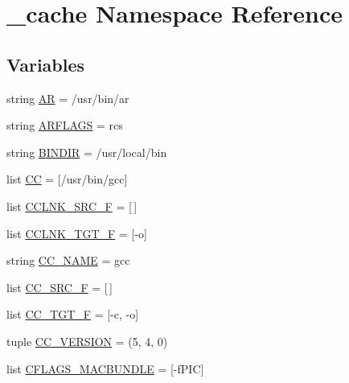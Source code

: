 \hypertarget{namespace__cache}{}\section{\+\_\+cache Namespace Reference}
\label{namespace__cache}
\subsection*{Variables}
\begin{DoxyCompactItemize}
\item 
string \hyperlink{namespace__cache_a9d44e2832ad98b40a7f591b4471b7814}{AR} = \textquotesingle{}/usr/bin/ar\textquotesingle{}
\item 
string \hyperlink{namespace__cache_a395ef3eaeed77b4070ca7457afbf4635}{A\+R\+F\+L\+A\+GS} = \textquotesingle{}rcs\textquotesingle{}
\item 
string \hyperlink{namespace__cache_a39d7403c7b95311b5d340d6b9c18cab2}{B\+I\+N\+D\+IR} = \textquotesingle{}/usr/local/bin\textquotesingle{}
\item 
list \hyperlink{namespace__cache_a69272eaadc8cff6c80315cdefdb1047f}{CC} = \mbox{[}\textquotesingle{}/usr/bin/gcc\textquotesingle{}\mbox{]}
\item 
list \hyperlink{namespace__cache_a4590b431f6ecc55cee80fce621aac1aa}{C\+C\+L\+N\+K\+\_\+\+S\+R\+C\+\_\+F} = \mbox{[}$\,$\mbox{]}
\item 
list \hyperlink{namespace__cache_ae1de6f3a238cf6618d1da773984dd1f8}{C\+C\+L\+N\+K\+\_\+\+T\+G\+T\+\_\+F} = \mbox{[}\textquotesingle{}-\/o\textquotesingle{}\mbox{]}
\item 
string \hyperlink{namespace__cache_a90b5121dca968e28cbdc39b59db3c5ca}{C\+C\+\_\+\+N\+A\+ME} = \textquotesingle{}gcc\textquotesingle{}
\item 
list \hyperlink{namespace__cache_af090cf8304d8536db7d011683c923e2a}{C\+C\+\_\+\+S\+R\+C\+\_\+F} = \mbox{[}$\,$\mbox{]}
\item 
list \hyperlink{namespace__cache_a1a7794852449e3f62f454343af39ccbc}{C\+C\+\_\+\+T\+G\+T\+\_\+F} = \mbox{[}\textquotesingle{}-\/c\textquotesingle{}, \textquotesingle{}-\/o\textquotesingle{}\mbox{]}
\item 
tuple \hyperlink{namespace__cache_afb205004bfd094aad60b6834e130271c}{C\+C\+\_\+\+V\+E\+R\+S\+I\+ON} = (\textquotesingle{}5\textquotesingle{}, \textquotesingle{}4\textquotesingle{}, \textquotesingle{}0\textquotesingle{})
\item 
list \hyperlink{namespace__cache_a4e059595d9dd82bc329dd3f2878030e8}{C\+F\+L\+A\+G\+S\+\_\+\+M\+A\+C\+B\+U\+N\+D\+LE} = \mbox{[}\textquotesingle{}-\/f\+P\+IC\textquotesingle{}\mbox{]}

\end{DoxyCompactItemize}
